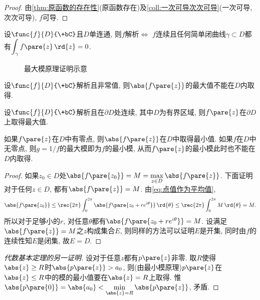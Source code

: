 \documentclass{ctexart}
\begin{document}
\begin{proof}
    由\cref{thm:原函数的存在性}(原函数存在)及\cref{coll:一次可导次次可导}(一次可导, 次次可导), $f$可导.
\end{proof}
\begin{corollary}
    设$\func{f}{D}{\+bC}$且$D$单连通, 则$f$解析$\Leftrightarrow$ $f$连续且任何简单闭曲线$\gamma\subset D$都有$\displaystyle \int_\gamma f\pare{z}\,\rd{z} = 0$.
\end{corollary}
\begin{figure}[ht]
    \centering
    \caption{最大模原理证明示意}
\end{figure}
\begin{theorem}[最大模原理]
    设$\func{f}{D}{\+bC}$解析且非常值, 则$\abs{f\pare{z}}$的最大值不能在$D$内取得.
\end{theorem}
\begin{corollary}
    设$\func{f}{D}{\+bC}$解析且在$\partial D$处连续, 其中$D$为有界区域, 则$f\pare{z}$在$\partial D$上取得最大值.
\end{corollary}
\begin{remark}
    如果$f\pare{z}$在$D$中有零点, 则$\abs{f\pare{z}}$在$D$中取得最小值. 如果$f$在$D$中无零点, 则$g=1/f$的最大模即为$f$的最小模, 从而$f\pare{z}$的最小模此时也不能在$D$内取得.
\end{remark}
\begin{proof}
    如果$z_0\in D$处$\abs{f\pare{z_0}}=M = \displaystyle \max_{z\in D} \abs{f\pare{z}}$. 下面证明对于任何$z\in D$, 都有$\abs{f\pare{z}} = M$. 由\eqref{eq:点值作为平均值},
    \[ \abs{f\pare{z_0}} \le \rec{2\pi}\int_0^{2\pi} \abs{f\pare{z_0+re^{i\theta}}}\,\rd{\theta} \le \rec{2\pi}\int_0^{2\pi} M\,\rd{\theta} = M. \]
    所以对于足够小的$r$, 对任意$\theta$都有$\abs{f\pare{z_0 + re^{i\theta}}} = M$. 设满足$\abs{f\pare{z}}=M$之$z$构成集合$E$, 则同样的方法可以证明$E$是开集, 同时由$f$的连续性知$E$是闭集, 故$E=D$.
\end{proof}
\begin{proof}[代数基本定理的另一证明]
    设对于任意$z$都有$p\pare{z}$非零. 取$R$使得$\abs{z}\ge R$时$\abs{p\pare{z}}>a_0$, 则(由最小模原理)$p\pare{z}$在$\abs{z} \le R$中的模的最小值要在$\abs{z} = R$上取得. 惟$\abs{p\pare{0}} = \abs{a_0}<\displaystyle \min_{\abs{z}=R}\abs{p\pare{z}}$, 矛盾.
\end{proof}


\end{document}
